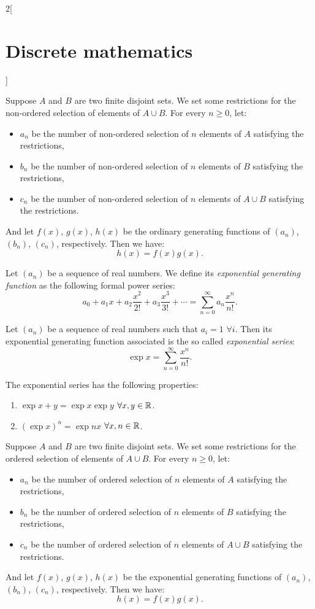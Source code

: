 \documentclass[../../../main.tex]{subfiles}
\begin{document}
\begin{multicols}{2}[\section{Discrete mathematics}]
\begin{prop}
Suppose $A$ and $B$ are two finite disjoint sets. We set some restrictions for the non-ordered selection of elements of $A\cup B$. For every $n\geq 0$, let:
\begin{itemize}
    \item $a_n$ be the number of non-ordered selection of $n$ elements of $A$ satisfying the restrictions,
    \item $b_n$ be the number of non-ordered selection of $n$ elements of $B$ satisfying the restrictions,
    \item $c_n$ be the number of non-ordered selection of $n$ elements of $A\cup B$ satisfying the restrictions.
\end{itemize}
And let $f(x)$, $g(x)$, $h(x)$ be the ordinary generating functions of $(a_n)$, $(b_n)$, $(c_n)$, respectively. Then we have: $$h(x)=f(x)g(x).$$
\end{prop}
\begin{definition}
Let $(a_n)$ be a sequence of real numbers. We define its \textit{exponential generating function} as the following formal power series: $$a_0+a_1x+a_2\frac{x^2}{2!}+a_3\frac{x^3}{3!}+\cdots=\sum_{n=0}^\infty a_n\frac{x^n}{n!}.$$
\end{definition}
\begin{definition}
Let $(a_n)$ be a sequence of real numbers such that $a_i=1$ $\forall i$. Then its exponential generating function associated is the so called \textit{exponential series}: $$\exp{x}=\sum_{n=0}^\infty \frac{x^n}{n!}.$$
\end{definition}
\begin{prop}
The exponential series has the following properties:
\begin{enumerate}
    \item $\exp{x+y}=\exp{x}\exp{y}$ $\forall x,y\in\mathbb{R} $.
    \item $(\exp{x})^n=\exp{nx}$ $\forall x,n\in\mathbb{R} $.
\end{enumerate}
\end{prop}
\begin{prop}
Suppose $A$ and $B$ are two finite disjoint sets. We set some restrictions for the ordered selection of elements of $A\cup B$. For every $n\geq 0$, let:
\begin{itemize}
    \item $a_n$ be the number of ordered selection of $n$ elements of $A$ satisfying the restrictions,
    \item $b_n$ be the number of ordered selection of $n$ elements of $B$ satisfying the restrictions,
    \item $c_n$ be the number of ordered selection of $n$ elements of $A\cup B$ satisfying the restrictions.
\end{itemize}
And let $f(x)$, $g(x)$, $h(x)$ be the exponential generating functions of $(a_n)$, $(b_n)$, $(c_n)$, respectively. Then we have: $$h(x)=f(x)g(x).$$
\end{prop}

\end{multicols}
\end{document}

